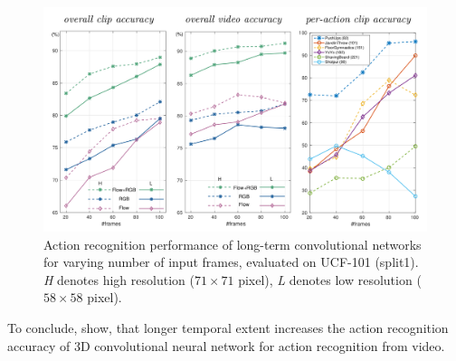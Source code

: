 \begin{figure}[H]
    \centering
    \includegraphics[width=\textwidth]{img_deep/longterm_systematical}
    \caption{Action recognition performance of long-term convolutional networks for varying number of input frames, evaluated on UCF-101 (split1). \textit{H} denotes high resolution ($71 \times 71$ pixel), \textit{L} denotes low resolution ($58 \times 58$ pixel). \cite{varol_long-term_2016}}
    \label{fig:longterm_systematical}
\end{figure}

To conclude, \textcite{varol_long-term_2016} show, that longer temporal extent increases the action recognition accuracy of 3D convolutional neural network for action recognition from video.

%
%


